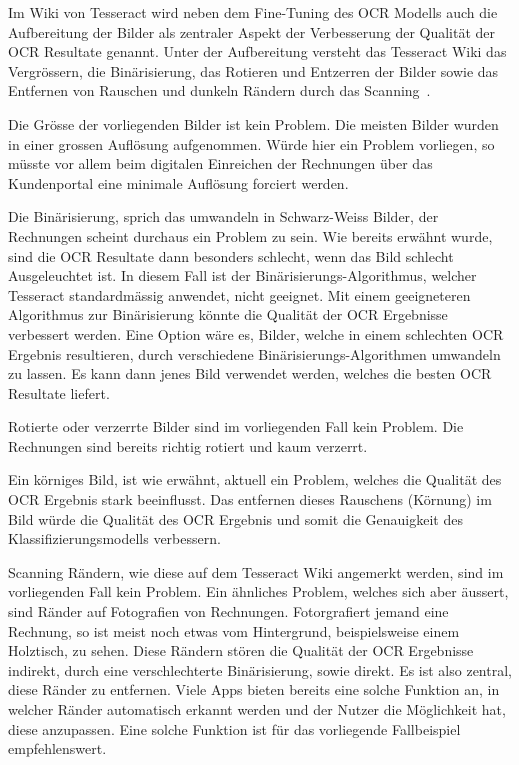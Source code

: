 Im Wiki von Tesseract wird neben dem Fine-Tuning des OCR Modells auch die Aufbereitung der Bilder als zentraler Aspekt der Verbesserung der Qualität der OCR Resultate genannt. Unter der Aufbereitung versteht das Tesseract Wiki das Vergrössern, die Binärisierung, das Rotieren und Entzerren der Bilder sowie das Entfernen von Rauschen und dunkeln Rändern durch das Scanning~\autocite{TesseractQuality}.

Die Grösse der vorliegenden Bilder ist kein Problem. Die meisten Bilder wurden in einer grossen Auflösung aufgenommen. Würde hier ein Problem vorliegen, so müsste vor allem beim digitalen Einreichen der Rechnungen über das Kundenportal eine minimale Auflösung forciert werden.

Die Binärisierung, sprich das umwandeln in Schwarz-Weiss Bilder, der Rechnungen scheint durchaus ein Problem zu sein. Wie bereits erwähnt wurde, sind die OCR Resultate dann besonders schlecht, wenn das Bild schlecht Ausgeleuchtet ist. In diesem Fall ist der Binärisierungs-Algorithmus, welcher Tesseract standardmässig anwendet, nicht geeignet. Mit einem geeigneteren Algorithmus zur Binärisierung könnte die Qualität der OCR Ergebnisse verbessert werden. Eine Option wäre es, Bilder, welche in einem schlechten OCR Ergebnis resultieren, durch verschiedene Binärisierungs-Algorithmen umwandeln zu lassen. Es kann dann jenes Bild verwendet werden, welches die besten OCR Resultate liefert.


Rotierte oder verzerrte Bilder sind im vorliegenden Fall kein Problem. Die Rechnungen sind bereits richtig rotiert und kaum verzerrt.

Ein körniges Bild, ist wie erwähnt, aktuell ein Problem, welches die Qualität des OCR Ergebnis stark beeinflusst. Das entfernen dieses Rauschens (Körnung) im Bild würde die Qualität des OCR Ergebnis und somit die Genauigkeit des Klassifizierungsmodells verbessern.

Scanning Rändern, wie diese auf dem Tesseract Wiki angemerkt werden, sind im vorliegenden Fall kein Problem. Ein ähnliches Problem, welches sich aber äussert, sind Ränder auf Fotografien von Rechnungen. Fotorgrafiert jemand eine Rechnung, so ist meist noch etwas vom Hintergrund, beispielsweise einem Holztisch, zu sehen. Diese Rändern stören die Qualität der OCR Ergebnisse indirekt, durch eine verschlechterte Binärisierung, sowie direkt. Es ist also zentral, diese Ränder zu entfernen. Viele Apps bieten bereits eine solche Funktion an, in welcher Ränder automatisch erkannt werden und der Nutzer die Möglichkeit hat, diese anzupassen. Eine solche Funktion ist für das vorliegende Fallbeispiel empfehlenswert.

